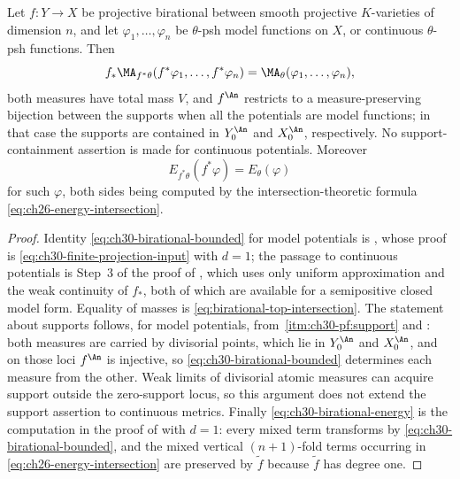 \begin{theorem}
\label{thm:ch30-birational-identification}
Let \(f:Y\to X\) be projective birational between smooth projective
\(K\)-varieties of dimension \(n\), and let \(\varphi_1,\ldots,\varphi_n\)
be \(\theta\)-psh model functions on \(X\), or continuous
\(\theta\)-psh functions.  Then
\begin{equation}
\label{eq:ch30-birational-bounded}
 f_*\MA_{f^*\theta}(f^*\varphi_1,\ldots,f^*\varphi_n)
 =\MA_\theta(\varphi_1,\ldots,\varphi_n),
\end{equation}
both measures have total mass \(V\), and \(f^{\An}\) restricts to a
measure-preserving bijection between the supports when all the potentials
are model functions; in that case the supports are contained in
\(Y^{\An}_0\) and \(X^{\An}_0\), respectively.  No support-containment
assertion is made for continuous potentials.  Moreover
\begin{equation}
\label{eq:ch30-birational-energy}
 E_{f^*\theta}(f^*\varphi)=E_\theta(\varphi)
\end{equation}
for such \(\varphi\), both sides being computed by the
intersection-theoretic formula \eqref{eq:ch26-energy-intersection}.
\end{theorem}

\begin{proof}
Identity \eqref{eq:ch30-birational-bounded} for model potentials is
, whose proof is
\eqref{eq:ch30-finite-projection-input} with \(d=1\); the passage to
continuous potentials is Step~3 of the proof of
, which uses only uniform approximation and
the weak continuity of \(f_*\), both of which are available for a
semipositive closed model form.  Equality of masses is
\eqref{eq:birational-top-intersection}.  The statement about supports
follows, for model potentials, from
\,\cref{itm:ch30-pf:support} and
: both measures are carried by
divisorial points, which lie in \(Y^{\An}_0\) and \(X^{\An}_0\), and on
those loci \(f^{\An}\) is injective, so
\eqref{eq:ch30-birational-bounded} determines each measure from the other.
Weak limits of divisorial atomic measures can acquire support outside the
zero-support locus, so this argument does not extend the support assertion
to continuous metrics.  Finally
\eqref{eq:ch30-birational-energy} is the computation in the proof of
 with \(d=1\): every mixed term
transforms by \eqref{eq:ch30-birational-bounded}, and the
mixed vertical \((n+1)\)-fold terms occurring in
\eqref{eq:ch26-energy-intersection} are preserved by
\(\tilde f\) because \(\tilde f\) has degree one.
\end{proof}

